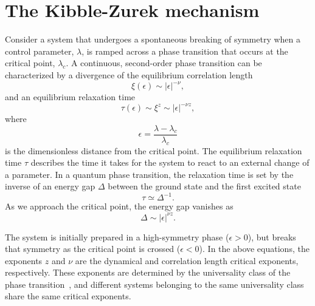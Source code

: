 \section{The Kibble-Zurek mechanism}\label{sec: the-KZM}
Consider a system that undergoes a spontaneous breaking of symmetry when a
control parameter, \( \lambda \), is ramped across a phase transition that
occurs at the critical point, \( \lambda_c \).
A continuous, second-order phase transition can be characterized by a divergence
of the equilibrium correlation length
\begin{equation}
    \xi(\epsilon) \sim |\epsilon|^{-\nu},
\end{equation}
and an equilibrium relaxation time
\begin{equation}
    \tau(\epsilon) \sim \xi^z \sim |\epsilon|^{-\nu z},
    \label{eq: equil-relax-time}
\end{equation}
where
\begin{equation}
    \epsilon = \frac{\lambda - \lambda_c}{\lambda_c}
\end{equation}
is the dimensionless distance from the critical point.
The equilibrium relaxation time \( \tau \) describes the time it takes for the
system to react to an external change of a parameter.
In a quantum phase transition, the relaxation time is set by the inverse of an
energy gap \( \Delta \) between the ground state and the first excited
state~\cite{Zurek2005, Damski2006}
\begin{equation}
    \tau \simeq \Delta^{-1}.
\end{equation}
As we approach the critical point, the energy gap vanishes as
\begin{equation}
    \Delta \sim |\epsilon|^{\nu z}.
\end{equation}

The system is initially prepared in a high-symmetry phase (\(  \epsilon > 0 \)),
but breaks that symmetry as the critical point is crossed (\(  \epsilon < 0 \)).
In the above equations, the exponents \(  z \) and \( \nu \) are the dynamical
and correlation length critical exponents, respectively.
These exponents are determined by the universality class of the phase
transition~\cite{Sachdev2011}, and different systems belonging to the same
universality class share the same critical exponents.

